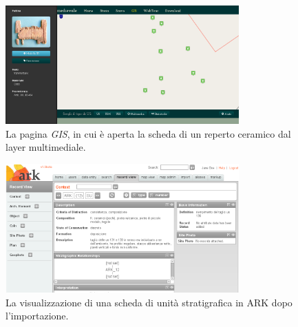 \documentclass{paper}
\begin{document}
\begin{figure}
    \centering
    \includegraphics[width=0.8\textwidth]{img/gis}
    \caption[La pagina \emph{GIS}]{La pagina \emph{GIS}, in cui è aperta la scheda di un reperto ceramico dal layer multimediale.}
    \label{fig:gis}
\end{figure}

\begin{figure}
    \centering
    \includegraphics[width=0.8\textwidth]{img/ark}
    \caption[Scheda US in ARK.]{La visualizzazione di una scheda di unità stratigrafica in ARK dopo l'importazione.}
    \label{fig:ark}
\end{figure}
\end{document}
